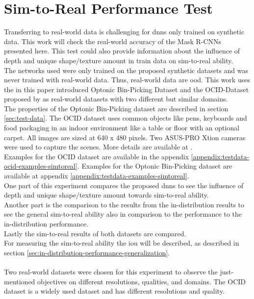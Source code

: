 	\section{Sim-to-Real Performance Test}
	\label{sec:simt-to-real-performance-test}
		Transferring to real-world data is challenging for \ac{dnn}s only trained on synthetic data. This work will check the real-world accuracy of the Mask R-CNNs presented here. This test could also provide information about the influence of depth and unique shape/texture amount in train data on sim-to-real ability.\\
		The networks used were only trained on the proposed synthetic datasets and was never trained with real-world data. Thus, real-world data are \acl{ood}. This work uses the in this paper introduced Optonic Bin-Picking Dataset and the OCID-Dataset proposed by \citeauthor{Suchi2019} as real-world datasets with two different but similar domains. \\
		The properties of the Optonic Bin-Picking dataset are described in section \ref{sec:test-data}. The OCID dataset uses common objects like pens, keyboards and food packaging in an indoor environment like a table or floor with an optional carpet. All images are sized at 640 x 480 pixels. Two ASUS-PRO Xtion cameras were used to capture the scenes. More details are available at .\\
		Examples for the OCID dataset are available in the appendix \ref{appendix:testdata-ocid-examples-simtoreal}. Examples for the Optonic Bin-Picking dataset are available at appendix \ref{appendix:testdata-examples-simtoreal}.
		\\
		One part of this experiment compares the proposed \ac{dnn}s to see the influence of depth and unique shape/texture amount towards sim-to-real ability.\\
		Another part is the comparison to the results from the in-distribution results to see the general sim-to-real ability also in comparison to the performance to the in-distribution performance.\\
		Lastly the sim-to-real results of both datasets are compared.\\
		For measuring the sim-to-real ability the \ac{iou} will be described, as described in section \ref{sec:in-distribution-performance-generalization}.\\
		\\
		Two real-world datasets were chosen for this experiment to observe the just-mentioned objectives on different resolutions, qualities, and domains. The OCID dataset is a widely used dataset  and has different resolutions and quality.
	
	
	
	
	
	
	
	
	


